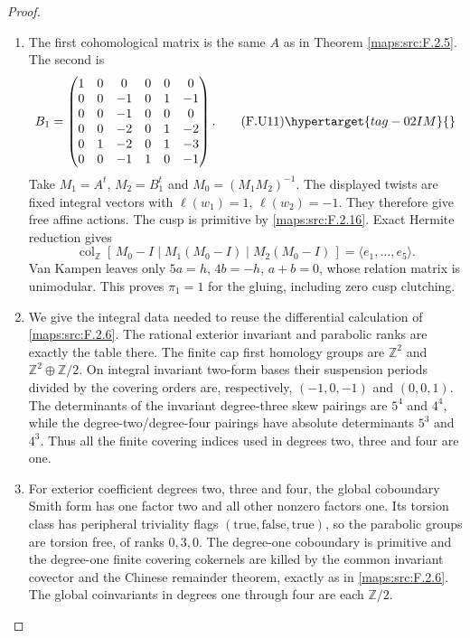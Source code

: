 \begin{proof}
\begin{enumerate}[label={$\langle1\rangle$\arabic*.}]
\item The first cohomological matrix is the same $A$ as in
Theorem \ref{maps:src:F.2.5}.  The second is
\[
 B_1=\begin{pmatrix}
 1&0&0&0&0&0\\
 0&0&-1&0&1&-1\\
 0&0&-1&0&0&0\\
 0&0&-2&0&1&-2\\
 0&1&-2&0&1&-3\\
 0&0&-1&1&0&-1
 \end{pmatrix}.
 \tag{F.U11}\hypertarget{tag-02IM}{}\label{maps:eq:F.U11}
\]
Take $M_1=A^t$, $M_2=B_1^t$ and
$M_0=(M_1M_2)^{-1}$.  The displayed twists are fixed integral
vectors with $\ell(w_1)=1$, $\ell(w_2)=-1$.
They therefore give free affine actions.  The cusp is
primitive by \ref{maps:src:F.2.16}.  Exact Hermite reduction gives
\[
 \operatorname{col}_{\mathbb Z}
 [\,M_0-I\mid M_1(M_0-I)\mid M_2(M_0-I)\,]
       =\langle e_1,\ldots,e_5\rangle.
\]
Van Kampen leaves only $5a=h$, $4b=-h$, $a+b=0$,
whose relation matrix is unimodular.  This proves
$\pi_1=1$ for the gluing, including zero cusp
clutching.

\item We give the integral data needed to reuse the differential calculation of \ref{maps:src:F.2.6}.  The rational exterior invariant and parabolic ranks
are exactly the table there.  The finite cap first homology
groups are $\mathbb Z^2$ and $\mathbb Z^2\oplus\mathbb Z/2$.
On integral invariant two-form bases their suspension periods
divided by the covering orders are, respectively,
$(-1,0,-1)$ and $(0,0,1)$.  The determinants of the invariant
degree-three skew pairings are $5^4$ and $4^4$, while the
degree-two/degree-four pairings have absolute determinants
$5^3$ and $4^3$.  Thus all the finite covering indices used
in degrees two, three and four are one.

\item For exterior coefficient degrees two, three and four, the
global coboundary Smith form has one factor two and all other
nonzero factors one.  Its torsion class has peripheral
triviality flags $(\mathrm{true},\mathrm{false},\mathrm{true})$,
so the parabolic groups are torsion free, of ranks $0,3,0$.
The degree-one coboundary is primitive and the degree-one
finite covering cokernels are killed by the common invariant
covector and the Chinese remainder theorem, exactly as in
\ref{maps:src:F.2.6}.  The global coinvariants in degrees one through four
are each $\mathbb Z/2$.


\end{enumerate}
\end{proof}
